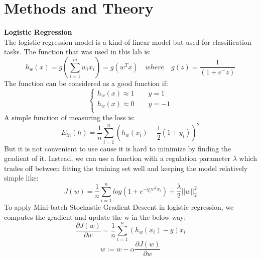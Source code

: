 \documentclass[journal, a4paper]{IEEEtran}
\begin{document}
\section{Methods and Theory}
\centering \textbf{Logistic Regression} \\
The logistic regression model is a kind of linear model but used for classification tasks. The function that was used in this lab is:
\begin{equation}
h_w(x) = g(\sum_{i=1}^m w_ix_i) = g(w^Tx)\quad where \quad g(z) = \frac 1 {(1+e^-z)}
\end{equation}
The function can be considered as a good function if:
\begin{equation}
\left\{
\begin{aligned}
h_w(x) \approx 1 \qquad y = 1 \\
h_w(x) \approx 0 \qquad y = -1 \\
\end{aligned}
\right.
\end{equation}
A simple function of measuring the loss is:
\begin{equation}
E_{in}(h) = \frac1 n \sum_{i=1}^n (h_w(x_i) - \frac 1 2(1+y_i))^2
\end{equation}
But it is not convenient to use cause it is hard to minimize by finding the gradient of it.
Instead, we can use a function with a regulation parameter $\lambda$ which trades off between fitting the training set well and keeping the
model relatively simple like:
\begin{equation}
J(w) = \frac1 n \sum_{i=1}^n log(1 + e^{-y_iw^Tx_i}) + \frac \lambda 2 ||w||^2_2
\end{equation}
To apply Mini-batch Stochastic Gradient Descent in logistic regression, we computes the gradient and update the w in the below way:
\begin{equation}
\frac {\partial J(w)} {\partial w} = \frac1 n \sum_{i=1}^n (h_w(x_i)-y)x_i 
\end{equation}
\begin{equation}
w:= w - \alpha \frac {\partial J(w)} {\partial w}
\end{equation} \\
\end{document}
